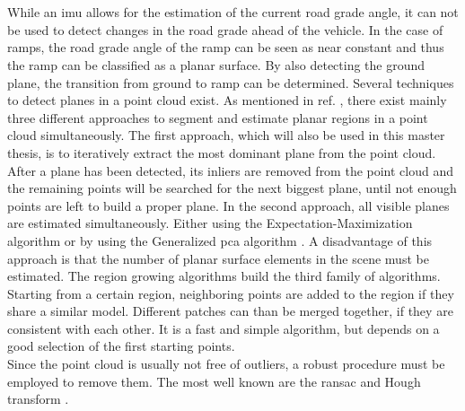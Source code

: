 \section{}
While an \gls{imu} allows for the estimation of the current road grade angle, it can not be used to detect changes in the road grade ahead of the vehicle.
In the case of ramps, the road grade angle of the ramp can be seen as near constant and thus the ramp can be classified as a planar surface.
By also detecting the ground plane, the transition from ground to ramp can be determined.
Several techniques to detect planes in a point cloud exist.
As mentioned in ref. \cite{Gallo2008}, there exist mainly three different approaches to segment and estimate planar regions in a point cloud simultaneously.
The first approach, which will also be used in this master thesis, is to iteratively extract the most dominant plane from the point cloud.
After a plane has been detected, its inliers are removed from the point cloud and the remaining points will be searched for the next biggest plane, until not enough points are left to build a proper plane.
In the second approach, all visible planes are estimated simultaneously.
Either using the Expectation-Maximization algorithm \cite{Liu2001, Triebel2005} or by using the Generalized \gls{pca} algorithm \cite{Vidal2005}.
A disadvantage of this approach is that the number of planar surface elements in the scene must be estimated.
The region growing algorithms \cite{Besl1988, Taubin1991} build the third family of algorithms.
Starting from a certain region, neighboring points are added to the region if they share a similar model.
Different patches can than be merged together, if they are consistent with each other.
It is a fast and simple algorithm, but depends on a good selection of the first starting points.\\
Since the point cloud is usually not free of outliers, a robust procedure must be employed to remove them.
The most well known are the \gls{ransac} \cite{Fischler1981} and Hough transform \cite{Illingworth1988}.

